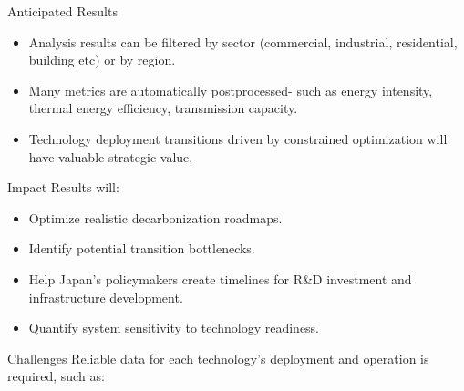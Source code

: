 \documentclass[final]{beamer}
\newlength{\onecolwid}
\newlength{\threecolwid}
\begin{document}
\begin{frame}[t]
\begin{columns}[t,totalwidth=\threecolwid]
\begin{column}{\onecolwid}
\begin{block}{Anticipated Results}

 \begin{itemize}
   \item Analysis results can be filtered by sector (commercial, industrial, residential, building etc) or by region.
   
   \item Many metrics are automatically postprocessed- such as energy intensity, thermal energy efficiency, transmission capacity. 
   
   \item Technology deployment transitions driven by constrained optimization will have valuable strategic value.    
 
 
 \end{itemize}  
 
 	
\end{block}







        \begin{alertblock}{Impact}
        \large Results will:
	\begin{itemize}
        \item {Optimize realistic decarbonization roadmaps.}
        \item {Identify potential transition bottlenecks.}
        \item {Help Japan's policymakers create timelines for R\&D investment and infrastructure development.}
        \item {Quantify system sensitivity to technology readiness.}
	\end{itemize}
        \end{alertblock}
   

\begin{block}{Challenges}
   Reliable data for each technology's deployment and operation is required, such as:
 
 	
\end{block}




\end{column}
\end{columns}
\end{frame}
\end{document}
